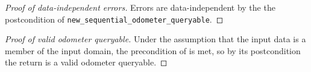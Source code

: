 \documentclass{article}
\begin{document}
\begin{proof}[Proof of data-independent errors]
    Errors are data-independent by the the postcondition of \texttt{new\_sequential\_odometer\_queryable}.
\end{proof}

\begin{proof}[Proof of valid odometer queryable]
    Under the assumption that the input data is a member of the input domain,
    the precondition of  is met,
    so by its postcondition the return is a valid odometer queryable.
\end{proof}
\end{document}
